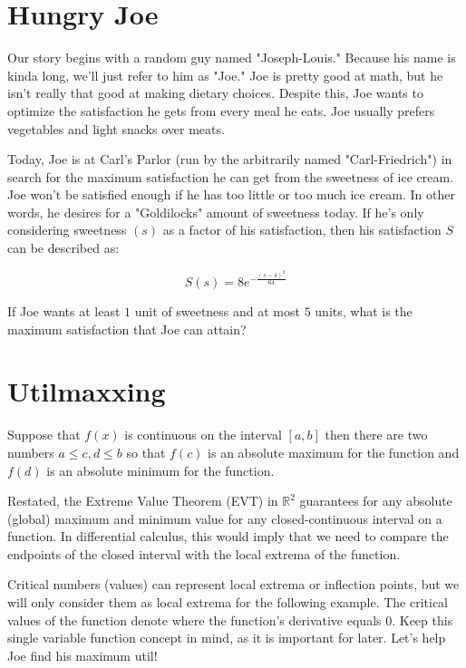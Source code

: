 \setcounter{chapter}{0}
\chapter{Hungry Joe}
Our story begins with a random guy named "Joseph-Louis."
Because his name is kinda long, we'll just refer to him as "Joe."
Joe is pretty good at math, but he isn't really that good at making dietary choices.
Despite this, Joe wants to optimize the satisfaction he gets from every meal he eats.
Joe usually prefers vegetables and light snacks over meats.

Today, Joe is at Carl's Parlor (run by the arbitrarily named "Carl-Friedrich") in search for the maximum satisfaction he can get from the sweetness of ice cream.
Joe won't be satisfied enough if he has too little or too much ice cream.
In other words, he desires for a "Goldilocks" amount of sweetness today.
If he's only considering sweetness $(s)$ as a factor of his satisfaction, then his satisfaction $S$ can be described as:\par
\LARGE
\begin{equation}
	S(s) = 8e^{-\frac{(s-4)^2}{64}}
\end{equation}
\normalsize
\begin{eg}
	If Joe wants at least $1$ unit of sweetness and at most $5$ units, what is the maximum satisfaction that Joe can attain?
\end{eg}
\setcounter{chapter}{1}
\chapter{Utilmaxxing}
\begin{theorem}
	Suppose that \(f\left( x \right)\) is continuous on the interval \(\left[ {a,b} \right]\) then there are two numbers \(a \le c,d \le b\) so that \(f\left( c \right)\) is an absolute maximum for the function and \(f\left( d \right)\) is an absolute minimum for the function.
\end{theorem}

Restated, the Extreme Value Theorem (EVT) in $\mathbb{R}^2$ guarantees for any absolute (global) maximum and minimum value for any closed-continuous interval on a function.
In differential calculus, this would imply that we need to compare the endpoints of the closed interval with the local extrema of the function.

Critical numbers (values) can represent local extrema or inflection points, but we will only consider them as local extrema for the following example.
The critical values of the function denote where the function's derivative equals $0$.
Keep this single variable function concept in mind, as it is important for later.
Let's help Joe find his maximum util!

